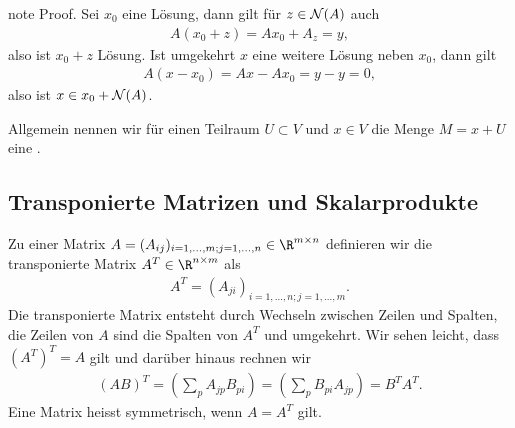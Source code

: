 \documentclass[letterpaper,10pt,english]{jupyterBook}
\begin{document}
\begin{sphinxadmonition}{note}
Proof.  Sei \(x_0\) eine Lösung, dann gilt für \(z \in {\cal N}(A)\) auch
\begin{equation*}
\begin{split} A(x_0+z) = Ax_0  + A_z =y,\end{split}
\end{equation*}
also ist \(x_0 + z\) Lösung. Ist umgekehrt \(x\) eine weitere Lösung neben \(x_0\), dann gilt
\begin{equation*}
\begin{split} A(x-x_0)  = Ax - Ax_0= y - y=0,\end{split}
\end{equation*}
also ist \(x \in x_0 + {\cal N}(A)\).
\end{sphinxadmonition}

Allgemein nennen wir für einen Teilraum \(U \subset V\) und \(x \in V\) die Menge  \(M= x + U\) eine .


\subsection{Transponierte Matrizen und Skalarprodukte}
\label{\detokenize{vektorraeume/LGS:transponierte-matrizen-und-skalarprodukte}}
Zu einer Matrix \(A=(A_{ij})_{i=1,\ldots,m;j=1,\ldots,n} \in \R^{m \times n}\) definieren wir die transponierte Matrix \(A^T
\in \R^{n \times m} \) als
\begin{equation*}
\begin{split} A^T =  (A_{ji})_{i=1,\ldots,n;j=1,\ldots,m}.\end{split}
\end{equation*}
Die transponierte Matrix entsteht durch Wechseln zwischen Zeilen und Spalten, die Zeilen von \(A\) sind die Spalten von \(A^T\) und umgekehrt. Wir sehen leicht, dass \((A^T)^T = A \) gilt und darüber hinaus rechnen wir
\begin{equation*}
\begin{split} (AB)^T = (\sum_{p } A_{jp} B_{pi} ) = (\sum_{p } B_{pi} A_{jp}  ) = B^T A^T.\end{split}
\end{equation*}
Eine Matrix heisst symmetrisch, wenn \(A=A^T\) gilt.
\end{document}
